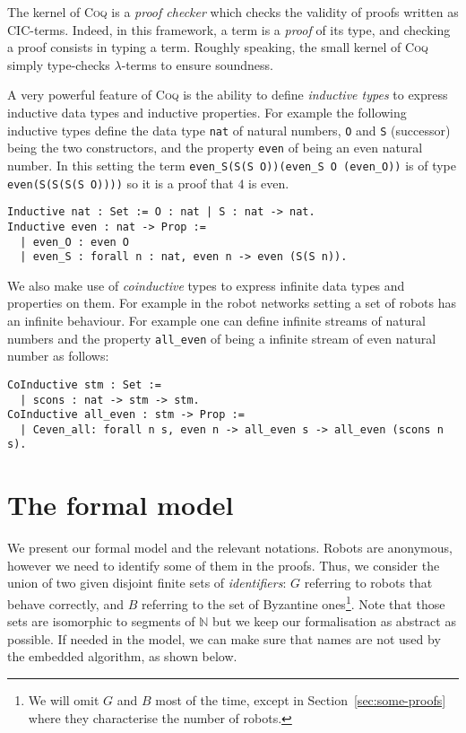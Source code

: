 \documentclass[11pt,a4]{llncs}
\newcommand{\x}{\xspace}
\newcommand{\coq}{\textsc{Coq}\x}
\begin{document}
The kernel of \coq is a \emph{proof checker} which checks the validity
of proofs written as CIC-terms. Indeed, in this framework, a term is a
\emph{proof} of its type, and checking a proof consists in typing a
term.  Roughly speaking, the small kernel of \coq{} simply
type-checks $\lambda$-terms to ensure soundness.


A very powerful feature of \coq{} is the ability to define
\emph{inductive types} to express inductive data types and inductive
properties. For example the following inductive types define the data
type \lstinline!nat! of natural numbers, \lstinline!O! and
\lstinline!S! (successor) being the two constructors, and the property \texttt{even} of being
an even natural number. In this setting the term \texttt{\small even\_S(S(S O))(even\_S O (even\_O))} is of type \texttt{\small even(S(S(S(S O))))} so it is a proof that $4$ is even.

\begin{lstlisting}
Inductive nat : Set := O : nat | S : nat -> nat.
Inductive even : nat -> Prop := 
  | even_O : even O 
  | even_S : forall n : nat, even n -> even (S(S n)).
\end{lstlisting}

We also make use of \emph{coinductive} types to express infinite data
types and properties on them. For example in the robot networks setting
a set of robots has an infinite behaviour. For example one can define infinite
streams of natural numbers and the property \texttt{\small all\_even}
of being a infinite stream of even natural number as follows:

\begin{lstlisting}
CoInductive stm : Set :=
  | scons : nat -> stm -> stm.
CoInductive all_even : stm -> Prop :=
  | Ceven_all: forall n s, even n -> all_even s -> all_even (scons n s).
\end{lstlisting}


\section{The formal model}
\label{sec:formal-model}


We present our formal model and the relevant notations. Robots are
anonymous, however we need to identify some of them in the proofs. Thus, we consider the
union of two given disjoint finite sets of \emph{identifiers}: $G$ referring
to robots that behave correctly, and $B$ referring to the set of
Byzantine ones\footnote{We will omit $G$ and $B$ most of the time, except in
  Section~\ref{sec:some-proofs} where they characterise the number of robots.}. Note that those sets are isomorphic to segments of
$\mathbb{N}$ but we keep our formalisation as abstract as possible. If
needed in the model, we can make sure that names are not used by the
embedded algorithm, as shown below.
\end{document}
